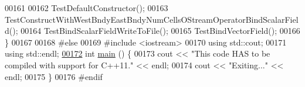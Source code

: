 \begin{DoxyCode}
00161 
00162   TestDefaultConstructor();
00163   TestConstructWithWestBndyEastBndyNumCellsOStreamOperatorBindScalarField();
00164   TestBindScalarFieldWriteToFile();
00165   TestBindVectorField();
00166 \}
00167 
00168 \textcolor{preprocessor}{#else}
00169 \textcolor{preprocessor}{#include <iostream>}
00170 \textcolor{keyword}{using} std::cout;
00171 \textcolor{keyword}{using} std::endl;
\hypertarget{mtk__uni__stg__grid__1d__test_8cc_source_l00172}{}\hyperlink{mtk__uni__stg__grid__1d__test_8cc_ae66f6b31b5ad750f1fe042a706a4e3d4}{00172} \textcolor{keywordtype}{int} \hyperlink{mtk__uni__stg__grid__1d__test_8cc_ae66f6b31b5ad750f1fe042a706a4e3d4}{main} () \{
00173   cout << \textcolor{stringliteral}{"This code HAS to be compiled with support for C++11."} << endl;
00174   cout << \textcolor{stringliteral}{"Exiting..."} << endl;
00175 \}
00176 \textcolor{preprocessor}{#endif}
\end{DoxyCode}
